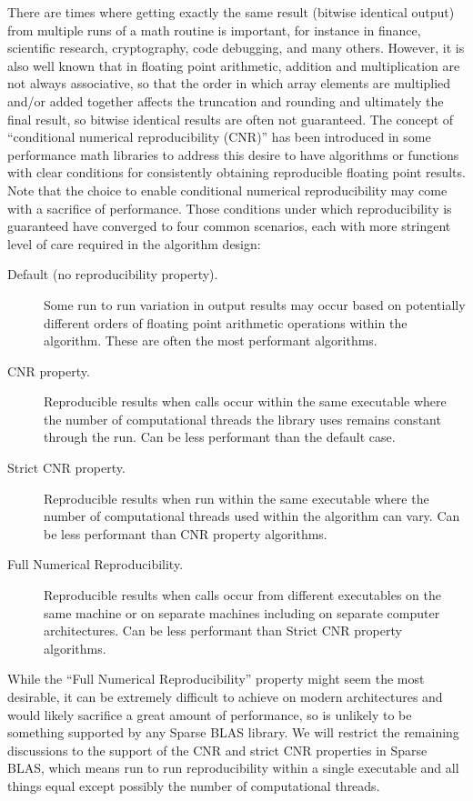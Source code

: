 \documentclass{article}
\begin{document}
There are times where getting exactly the same result (bitwise identical output) from multiple runs of a math routine is important, for instance in finance, scientific research, cryptography, code debugging, and many others.  However, it is also well known that in floating point arithmetic, addition and multiplication are not always associative, so that the order in which array elements are multiplied and/or added together affects the truncation and rounding and ultimately the final result, so bitwise identical results are often not guaranteed.  The concept of ``conditional numerical reproducibility (CNR)'' has been introduced in some performance math libraries to address this desire to have algorithms or functions with clear conditions for consistently obtaining reproducible floating point results.  Note that the choice to enable conditional numerical reproducibility may come with a sacrifice of performance. Those conditions under which reproducibility is guaranteed have converged to four common scenarios, each with more stringent level of care required in the algorithm design:
\begin{description}
\item [Default (no reproducibility property).] Some run to run variation in output results may occur based on potentially different orders of floating point arithmetic operations within the algorithm.  These are often the most performant algorithms.
\item [CNR property.] Reproducible results when calls occur within the same executable where the number of computational threads the library uses remains constant through the run. Can be less performant than the default case.
\item [Strict CNR property.] Reproducible results when run within the same executable where the number of computational threads used within the algorithm can vary. Can be less performant than CNR property algorithms.
\item [Full Numerical Reproducibility.] Reproducible results when calls occur from different executables on the same machine or on separate machines including on separate computer architectures.  Can be less performant than Strict CNR property algorithms.
\end{description}

While the ``Full Numerical Reproducibility'' property might seem the most desirable, it can be extremely difficult to achieve on modern architectures and would likely sacrifice a great amount of performance, so is unlikely to be something supported by any Sparse BLAS library.  We will restrict the remaining discussions to the support of the CNR and strict CNR properties in Sparse BLAS, which means run to run reproducibility within a single executable and all things equal except possibly the number of computational threads.
\end{document}
